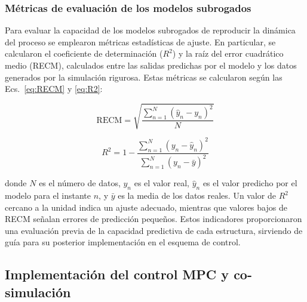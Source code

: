 \subsubsection{Métricas de evaluación de los modelos subrogados}

Para evaluar la capacidad de los modelos subrogados de reproducir la dinámica del proceso se emplearon métricas estadísticas de ajuste. En particular, se calcularon el coeficiente de determinación ($R^2$) y la raíz del error cuadrático medio (RECM), calculados entre las salidas predichas por el modelo y los datos generados por la simulación rigurosa. Estas métricas se calcularon según las Ecs.~\eqref{eq:RECM} y \eqref{eq:R2}:

\begin{equation}
    \mathrm{RECM} = \sqrt{\frac{\displaystyle\sum_{n=1}^{N}\!\left(\hat{y}_n - y_n\right)^2}{N}}
    \label{eq:RECM}
\end{equation}

\begin{equation}
    R^2 = 1 - \frac{\displaystyle\sum_{n=1}^{N}\!\left(y_n - \hat{y}_n\right)^2}
                   {\displaystyle\sum_{n=1}^{N}\!\left(y_n - \bar{y}\right)^2}
    \label{eq:R2}
\end{equation}

\noindent donde $N$ es el número de datos, $y_n$ es el valor real, $\hat{y}_n$ es el
valor predicho por el modelo para el instante $n$, y $\bar{y}$ es la media de los datos reales. Un valor de $R^2$ cercano a la unidad indica un ajuste adecuado, mientras que valores bajos de RECM señalan errores de predicción pequeños. Estos indicadores proporcionaron una evaluación previa de la capacidad predictiva de cada estructura, sirviendo de guía para su posterior implementación en el esquema de control.

\subsection{Implementación del control MPC y co-simulación}

